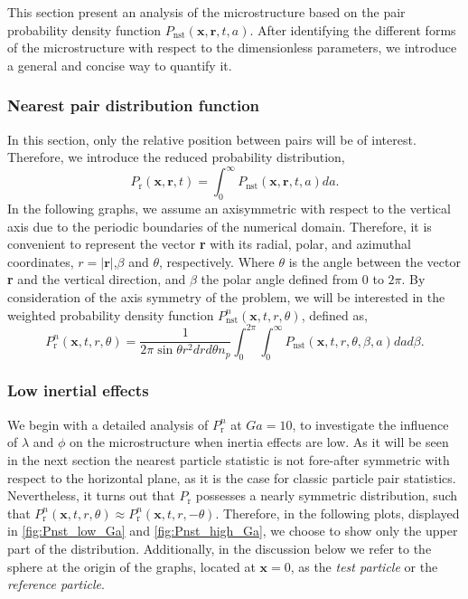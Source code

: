 This section present an analysis of the microstructure based on the pair probability density function  $P_\text{nst}(\textbf{x},\textbf{r},t,a)$.
After identifying the different forms of the microstructure with respect to the dimensionless parameters, we introduce a general and concise way to quantify it.

\subsubsection*{Nearest pair distribution function}
In this section, only the relative position between pairs will be of interest. 
Therefore, we introduce the reduced probability distribution,
\begin{equation*}
    P_\text{r}(\textbf{x},\textbf{r},t)
    = \int_0^\infty P_\text{nst}(\textbf{x},\textbf{r},t,a) da.
\end{equation*}
In the following graphs, we assume an axisymmetric with respect to the vertical axis due to the periodic boundaries of the numerical domain.
Therefore, it is convenient to represent the vector \textbf{r} with its radial, polar, and azimuthal coordinates,  $r = |\textbf{r}|$,$\beta$ and $\theta$, respectively.
Where $\theta$ is the angle between the vector \textbf{r} and the vertical direction, and $\beta$ the polar angle defined from $0$ to $2\pi$.
By consideration of the axis symmetry of the problem, we will be interested in the weighted probability density function $P_\text{nst}^n(\textbf{x},t,r,\theta)$, defined as, 
\begin{equation*}
    P_\text{r}^n(\textbf{x},t,r,\theta)
    =\frac{1}{2\pi \sin\theta r^2 dr d\theta n_p}
    \int_0^{2\pi}
    \int_0^\infty P_\text{nst}(\textbf{x},t,r,\theta,\beta,a) da d\beta.
\end{equation*}

\subsubsection*{Low inertial effects }
We begin with a detailed analysis of $P_\text{r}^n$ at $Ga =10$, to investigate the influence of $\lambda$ and $\phi$ on the microstructure when inertia effects are low.
As it will be seen in the next section the nearest particle statistic is not fore-after symmetric with respect to the horizontal plane, as it is the case for classic particle pair statistics. 
Nevertheless, it turns out that $P_\text{r}$ possesses a nearly symmetric distribution, such that $P_\text{r}^n(\textbf{x},t,r,\theta)\approx P_\text{r}^n(\textbf{x},t,r,- \theta)$. 
Therefore, in the following plots, displayed in \ref{fig:Pnst_low_Ga} and \ref{fig:Pnst_high_Ga}, we choose to show only the upper part of the distribution.
Additionally, in the discussion below we refer to the sphere at the origin of the graphs, located at $\textbf{x}=0$, as the \textit{test particle} or the \textit{reference particle}. 

